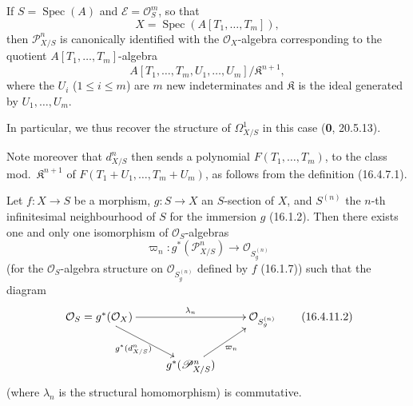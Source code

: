 \begin{corollary}[16.4.10]
\label{IV.16.4.10}
If $S=\operatorname{Spec}(A)$ and $\mathscr{E}=\mathcal{O}_S^m$, so that
\[
  X=\operatorname{Spec}(A[T_1,\ldots,T_m]),
\]
then $\mathscr{P}_{X/S}^n$ is canonically identified with the
$\mathcal{O}_X$-algebra corresponding to the quotient $A[T_1,\ldots,T_m]$-algebra
\[
  A[T_1,\ldots,T_m,U_1,\ldots,U_m]/\mathfrak{K}^{n+1},
\]
where the $U_i$ \textup{(}$1\leq i\leq m$\textup{)} are $m$ new indeterminates and
$\mathfrak{K}$ is the ideal generated by $U_1,\ldots,U_m$.
\end{corollary}

In particular, we thus recover the structure of $\varOmega_{X/S}^1$ in this case
(\textbf{0}, 20.5.13).

Note moreover that $d_{X/S}^n$ then sends a polynomial
$F(T_1,\ldots,T_m)$, to the class mod.\ $\mathfrak{K}^{n+1}$ of
$F(T_1+U_1,\ldots,T_m+U_m)$, as follows from the definition (16.4.7.1).

\begin{proposition}[16.4.11]
\label{IV.16.4.11}
Let $f:X\to S$ be a morphism, $g:S\to X$ an $S$-section of $X$, and
$S^{(n)}$ the $n$-th infinitesimal neighbourhood of $S$ for the immersion $g$
\textup{(16.1.2)}. Then there exists one and only one isomorphism of
$\mathcal{O}_S$-algebras
\[
  \varpi_n:g^*(\mathscr{P}_{X/S}^n)\longrightarrow
  \mathcal{O}_{S_g^{(n)}}
  \tag{16.4.11.1}
  \label{IV.16.4.11.1}
\]
(for the $\mathcal{O}_S$-algebra structure on
$\mathcal{O}_{S_g^{(n)}}$ defined by $f$ \textup{(16.1.7)}) such that the
diagram
\[
  \xymatrix{
    \mathcal{O}_S=g^*(\mathcal{O}_X)
      \ar[rr]^-{\lambda_n}\ar[dr]_-{g^*(d_{X/S}^n)}
      &&\mathcal{O}_{S_g^{(n)}}\\
    &g^*(\mathscr{P}_{X/S}^n)\ar[ur]_-{\varpi_n}
  }
  \tag{16.4.11.2}
  \label{IV.16.4.11.2}
\]
(where $\lambda_n$ is the structural homomorphism) is commutative.
\end{proposition}

